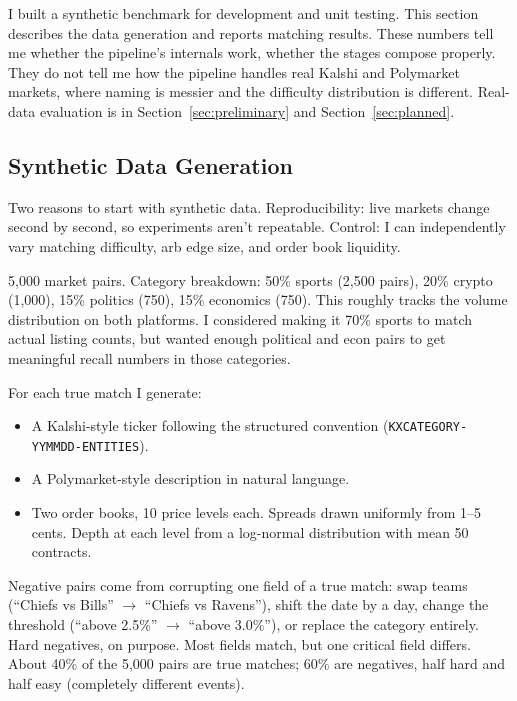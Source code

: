 \documentclass[11pt]{article}
\theoremstyle{definition}
\theoremstyle{remark}
\begin{document}
I built a synthetic benchmark for development and unit testing. This section describes the data generation and reports matching results. These numbers tell me whether the pipeline's internals work, whether the stages compose properly. They do not tell me how the pipeline handles real Kalshi and Polymarket markets, where naming is messier and the difficulty distribution is different. Real-data evaluation is in Section~\ref{sec:preliminary} and Section~\ref{sec:planned}.

\subsection{Synthetic Data Generation}
\label{sec:synth}

Two reasons to start with synthetic data. Reproducibility: live markets change second by second, so experiments aren't repeatable. Control: I can independently vary matching difficulty, arb edge size, and order book liquidity.

5,000 market pairs. Category breakdown: 50\% sports (2,500 pairs), 20\% crypto (1,000), 15\% politics (750), 15\% economics (750). This roughly tracks the volume distribution on both platforms. I considered making it 70\% sports to match actual listing counts, but wanted enough political and econ pairs to get meaningful recall numbers in those categories.

For each true match I generate:
\begin{itemize}
  \item A Kalshi-style ticker following the structured convention (\texttt{KXCATEGORY-YYMMDD-ENTITIES}).
  \item A Polymarket-style description in natural language.
  \item Two order books, 10 price levels each. Spreads drawn uniformly from 1--5 cents. Depth at each level from a log-normal distribution with mean 50 contracts.
\end{itemize}

Negative pairs come from corrupting one field of a true match: swap teams (``Chiefs vs Bills'' $\to$ ``Chiefs vs Ravens''), shift the date by a day, change the threshold (``above 2.5\%'' $\to$ ``above 3.0\%''), or replace the category entirely. Hard negatives, on purpose. Most fields match, but one critical field differs. About 40\% of the 5,000 pairs are true matches; 60\% are negatives, half hard and half easy (completely different events).
\end{document}
